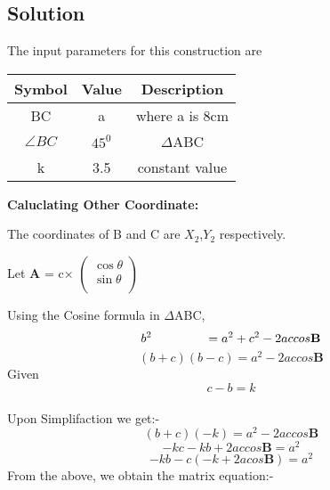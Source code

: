 \documentclass[10pt,a4paper]{report}
\let\vec\mathbf
\begin{document}
\begin{multicols}{2}
\section{Solution}
The input parameters for this construction are
\begin{center}
\begin{tabular}{|c|c|c|}
  \hline
  \textbf{Symbol}&\textbf{Value}&\textbf{Description}\\
  \hline
  BC & a & where a is 8cm\\
  \hline
  $\angle{BC}$ & $45^0$ &  $\Delta$ABC \\
  \hline
  k & 3.5 & constant value\\
  \hline
\end{tabular}
\end{center}
\raggedright\textbf{Caluclating Other Coordinate: } \\
\raggedright The coordinates of B and C are $X_{2}$,$Y_{2}$ respectively. \\
  \raggedright Let \textbf{A} = c$\times$
  $\begin{pmatrix} 
 \cos \theta\\
  \sin\theta \\
\end{pmatrix}$ \\
\raggedright Using the Cosine formula in  $\Delta$ABC, \\ \vspace{3mm}
\begin{equation}
{b}^2\hspace{1.5cm}= {a}^2 + {c}^2 - 2accos\vec{B}
\end{equation}
\begin{equation}
(b+c)(b-c) = {a}^2- 2accos\vec{B}
\end{equation}
Given
\begin{equation}
        c-b=k
\end{equation}\\
Upon Simplifaction we get:- \\
\begin{equation}
  (b+c)(-k) = {a}^2- 2accos\vec{B} 
\end{equation}
\begin{equation}
-kc-kb+2accos\vec{B}= {a}^2
\end{equation}
\begin{equation}
-kb-c(-k+2acos\vec{B})= {a}^2
\end{equation}
     From the above, we obtain the matrix equation:- \\ \vspace{3mm}

\end{multicols}
\end{document}
